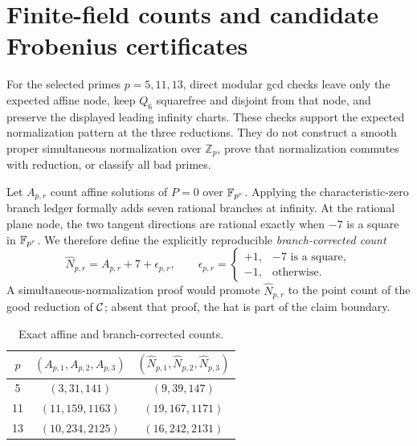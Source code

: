 \section{Finite-field counts and candidate Frobenius certificates}\label{sec:frobenius}

For the selected primes $p=5,11,13$, direct modular gcd checks leave only the
expected affine node, keep $Q_6$ squarefree and disjoint from that node, and
preserve the displayed leading infinity charts.  These checks support the
expected normalization pattern at the three reductions.  They do not
construct a smooth proper simultaneous normalization over $\mathbb Z_p$, prove that
normalization commutes with reduction, or classify all bad primes.

Let $A_{p,r}$ count affine solutions of $P=0$ over $\mathbb F_{p^r}$.  Applying the
characteristic-zero branch ledger formally adds seven rational branches at
infinity.  At the rational plane node, the two tangent directions are
rational exactly when $-7$ is a square in $\mathbb F_{p^r}$.  We therefore define
the explicitly reproducible \emph{branch-corrected count}
\begin{equation}\label{eq:countcorrection}
 \widehat N_{p,r}=A_{p,r}+7+\epsilon_{p,r},\qquad
 \epsilon_{p,r}=\begin{cases}+1,&-7\text{ is a square},\\-1,&\text{otherwise}.
 \end{cases}
\end{equation}
A simultaneous-normalization proof would promote $\widehat N_{p,r}$ to the
point count of the good reduction of $\mathcal C$; absent that proof, the hat is
part of the claim boundary.

\begin{table}[ht]
\centering
\caption{Exact affine and branch-corrected counts.}
\begin{tabular}{c@{\qquad}c@{\qquad}c}
\toprule
$p$ & $(A_{p,1},A_{p,2},A_{p,3})$ & $(\widehat N_{p,1},\widehat N_{p,2},\widehat N_{p,3})$\\
\midrule
5  & $(3,31,141)$    & $(9,39,147)$\\
11 & $(11,159,1163)$ & $(19,167,1171)$\\
13 & $(10,234,2125)$ & $(16,242,2131)$\\
\bottomrule
\end{tabular}
\end{table}

